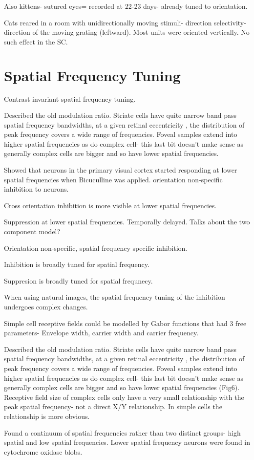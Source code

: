 \cite{Sherk1975} Also kittens- sutured eyes= recorded at 22-23 days- already tuned to orientation. 

\cite{Cynader1975} Cats reared in a room with unidirectionally moving stimuli- direction selectivity- direction of the moving grating (leftward). Most units were oriented vertically. No such effect in the SC. 

\section{Spatial Frequency Tuning}

\cite{Skottun1987} Contrast invariant spatial frequency tuning. 

\cite{DeValois1982a} Described the old modulation ratio. Striate cells have quite narrow band pass spatial frequency bandwidths, at a given retinal eccentricity , the distribution of peak frequency covers a wide range of frequencies.  Foveal samples extend into higher spatial frequencies as do complex cell- this last bit doesn't make sense as generally complex cells are bigger and so have lower spatial frequencies.

\cite{Vidyasagar1994a} Showed that neurons in the primary visual cortex started responding at lower spatial frequencies when Bicuculline was applied. orientation non-specific inhibition to neurons.

\cite{Meese2004} Cross orientation inhibition is more visible at lower spatial frequencies.

\cite{Bredfeldt2002a} Suppression at lower spatial frequencies. Temporally delayed. Talks about the two component model?

\cite{Bauman1991} Orientation non-specific, spatial frequency specific inhibition.

\cite{Morrone1982} Inhibition is broadly tuned for spatial frequency.

\cite{DeAngelis1992} Suppresion is broadly tuned for spatial frequnecy. 

\cite{David2004} When using natural images, the spatial frequency tuning of the inhibition undergoes complex changes.

\cite{Field1986} Simple cell receptive fields could be modelled by Gabor functions that had 3 free parameters- Envelope width, carrier width and carrier frequency. 
	
	\cite{DeValois1982a} Described the old modulation ratio. Striate cells have quite narrow band pass spatial frequency bandwidths, at a given retinal eccentricity , the distribution of peak frequency covers a wide range of frequencies.  Foveal samples extend into higher spatial frequencies as do complex cell- this last bit doesn't make sense as generally complex cells are bigger and so have lower spatial frequencies (Fig6).
	Receptive field size of complex cells only have a very small relationship with the peak spatial frequency- not a direct X/Y relationship.
	In simple cells the relationship is more obvious. 
	
	\cite{Silverman1989} Found a continuum of spatial frequencies rather than two distinct groups- high spatial and low spatial frequencies. Lower spatial frequency neurons were found in cytochrome oxidase blobs.
	